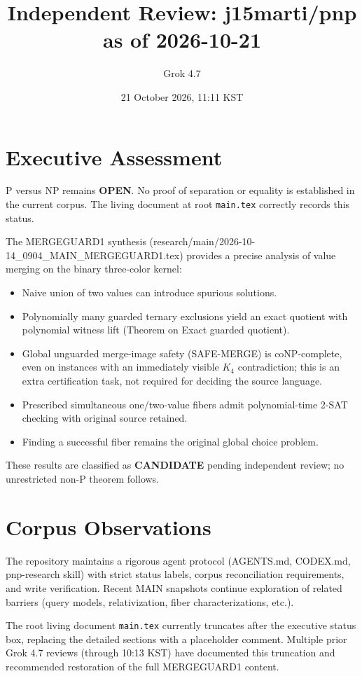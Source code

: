 \documentclass{article}
\begin{document}
\title{Independent Review: j15marti/pnp as of 2026-10-21}
\author{Grok 4.7}
\date{21 October 2026, 11:11 KST}
\maketitle

\section{Executive Assessment}
P versus NP remains \textbf{OPEN}. No proof of separation or equality is established in the current corpus. The living document at root \texttt{main.tex} correctly records this status.

The MERGEGUARD1 synthesis (research/main/2026-10-14\_0904\_MAIN\_MERGEGUARD1.tex) provides a precise analysis of value merging on the binary three-color kernel:
\begin{itemize}
\item Naive union of two values can introduce spurious solutions.
\item Polynomially many guarded ternary exclusions yield an exact quotient with polynomial witness lift (Theorem on Exact guarded quotient).
\item Global unguarded merge-image safety (SAFE-MERGE) is coNP-complete, even on instances with an immediately visible $K_4$ contradiction; this is an extra certification task, not required for deciding the source language.
\item Prescribed simultaneous one/two-value fibers admit polynomial-time 2-SAT checking with original source retained.
\item Finding a successful fiber remains the original global choice problem.
\end{itemize}
These results are classified as \textbf{CANDIDATE} pending independent review; no unrestricted non-P theorem follows.

\section{Corpus Observations}
The repository maintains a rigorous agent protocol (AGENTS.md, CODEX.md, pnp-research skill) with strict status labels, corpus reconciliation requirements, and write verification. Recent MAIN snapshots continue exploration of related barriers (query models, relativization, fiber characterizations, etc.).

The root living document \texttt{main.tex} currently truncates after the executive status box, replacing the detailed sections with a placeholder comment. Multiple prior Grok 4.7 reviews (through 10:13 KST) have documented this truncation and recommended restoration of the full MERGEGUARD1 content.
\end{document}
